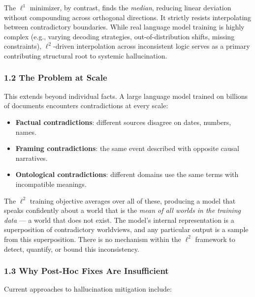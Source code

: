 \documentclass[
]{article}
\providecommand{\tightlist}{%
  \setlength{\itemsep}{0pt}\setlength{\parskip}{0pt}}
\begin{document}
The \(\ell^1\) minimizer, by contrast, finds the \emph{median}, reducing
linear deviation without compounding across orthogonal directions. It
strictly resists interpolating between contradictory boundaries. While
real language model training is highly complex (e.g., varying decoding
strategies, out-of-distribution shifts, missing constraints),
\(\ell^2\)-driven interpolation across inconsistent logic serves as a
primary contributing structural root to systemic hallucination.

\subsubsection{1.2 The Problem at Scale}\label{the-problem-at-scale}

This extends beyond individual facts. A large language model trained on
billions of documents encounters contradictions at every scale:

\begin{itemize}
\tightlist
\item
  \textbf{Factual contradictions}: different sources disagree on dates,
  numbers, names.
\item
  \textbf{Framing contradictions}: the same event described with
  opposite causal narratives.
\item
  \textbf{Ontological contradictions}: different domains use the same
  terms with incompatible meanings.
\end{itemize}

The \(\ell^2\) training objective averages over all of these, producing
a model that speaks confidently about a world that is the \emph{mean of
all worlds in the training data} --- a world that does not exist. The
model's internal representation is a superposition of contradictory
worldviews, and any particular output is a sample from this
superposition. There is no mechanism within the \(\ell^2\) framework to
detect, quantify, or bound this inconsistency.

\subsubsection{1.3 Why Post-Hoc Fixes Are
Insufficient}\label{why-post-hoc-fixes-are-insufficient}

Current approaches to hallucination mitigation include:
\end{document}
